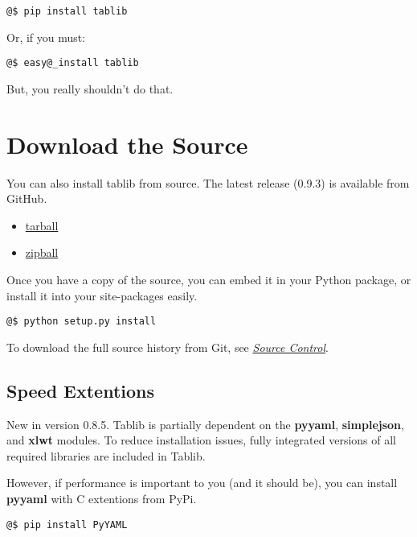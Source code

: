 \documentclass[a4paper,12pt,english]{sphinxmanual}
\begin{document}
\begin{Verbatim}[commandchars=@\[\]]
@$ pip install tablib
\end{Verbatim}

Or, if you must:

\begin{Verbatim}[commandchars=@\[\]]
@$ easy@_install tablib
\end{Verbatim}

But, you really shouldn't do that.


\section{Download the Source}
\label{install:download-the-source}
You can also install tablib from source. The latest release (0.9.3) is available from GitHub.
\begin{itemize}
\item {} 
\href{http://github.com/kennethreitz/tablib/tarball/master}{tarball}

\item {} 
\href{http://github.com/kennethreitz/tablib/zipball/master}{zipball}

\end{itemize}

Once you have a copy of the source, you can embed it in your Python package, or install it into your site-packages easily.

\begin{Verbatim}[commandchars=@\[\]]
@$ python setup.py install
\end{Verbatim}

To download the full source history from Git, see {\hyperref[development:scm]{\emph{Source Control}}}.


\subsection{Speed Extentions}
\label{install:speed-extentions}\label{install:id1}New in version 0.8.5.
Tablib is partially dependent on the \textbf{pyyaml}, \textbf{simplejson}, and \textbf{xlwt} modules. To reduce installation issues, fully integrated versions of all required libraries are included in Tablib.

However, if performance is important to you (and it should be), you can install  \textbf{pyyaml} with C extentions from PyPi.

\begin{Verbatim}[commandchars=@\[\]]
@$ pip install PyYAML
\end{Verbatim}
\end{document}
